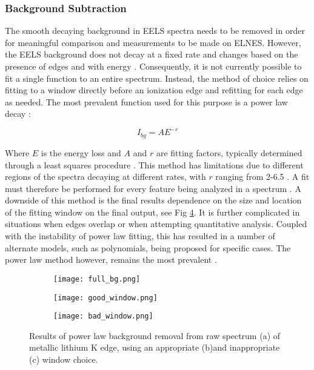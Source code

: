 \subsubsection{Background Subtraction} \label{bg_section}
The smooth decaying background in EELS spectra needs to be removed in order for meaningful comparison and measurements to be made on ELNES.  However, the EELS background does not decay at a fixed rate and changes based on the presence of edges and with energy \cite{new_bg}. Consequently, it is not currently possible to fit a single function to an entire spectrum.  Instead, the method of choice relies on fitting to a window directly before an ionization edge and refitting for each edge as needed.  The most prevalent function used for this purpose is a power law decay \cite{Egerton}: 

\begin{equation}
	I_{bg} = AE^{-r}
\end{equation}


Where $E$ is the energy loss and $A$ and $r$ are fitting factors, typically determined through a least squares procedure \cite{reimer_transmission_2008}.  This method has limitations due to different regions of the spectra decaying at different rates, with $r$ ranging from 2-6.5 \cite{reimer_transmission_2008}. A fit must therefore be performed for every feature being analyzed in a spectrum \cite{verbeeck_model_2004, egerton_inelastic_1975}.  A downside of this method is the final results dependence on the size and location of the fitting window on the final output, see Fig \ref{bg_removal}.  It is further complicated in situations when edges overlap or when attempting quantitative analysis.  Coupled with the instability of power law fitting, this has resulted in a number of alternate models, such as polynomials, being proposed for specific cases. The power law method however, remains the most prevalent \cite{verbeeck_model_2004, riedl_extraction_2006}.  

\begin{figure}
	\centering
	\begin{subfigure}{0.45\textwidth}
		\texttt{[image: full\_bg.png]} 
		\caption{}
		\label{full_bg}
	\end{subfigure}
	\hfill
	
	\begin{subfigure}{0.45\textwidth}
		\texttt{[image: good\_window.png]} 
		\caption{}
		\label{good_window}
	\end{subfigure}
	\begin{subfigure}{0.45\textwidth}
		\texttt{[image: bad\_window.png]} 
		\caption{}
		\label{bad_window}
	\end{subfigure}
	\caption{Results of power law background removal from raw spectrum (a) of metallic lithium K edge, using an appropriate (b)and inappropriate (c) window choice.}
	\label{bg_removal}
\end{figure}


